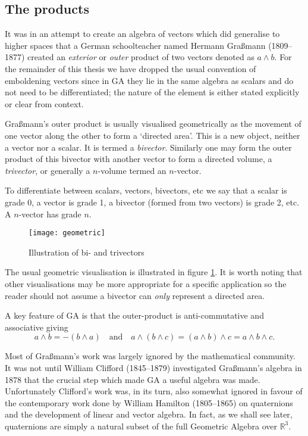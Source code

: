 \subsection{The products}

It was in an attempt\cite{GA:grassmann} to create an algebra of vectors which
did generalise to higher spaces that a German schoolteacher named Hermann
Gra{\ss}mann (1809--1877) created an \emph{exterior} or \emph{outer} product
of two vectors denoted as $a \wedge b$. For the remainder of this thesis we
have dropped the usual convention of emboldening vectors since in GA they lie
in the same algebra as scalars and do not need to be differentiated; the
nature of the element is either stated explicitly or clear from context.

Gra{\ss}mann's outer product is usually visualised geometrically as the
movement of one vector along the other to form a `directed area'. This is a
new object, neither a vector nor a scalar. It is termed a \emph{bivector}.
Similarly one may form the outer product of this bivector with another vector
to form a directed volume, a \emph{trivector}, or generally a $n$-volume
termed an $n$-vector. 

To differentiate between scalars, vectors, bivectors, etc we say that a scalar
is grade 0, a vector is grade 1, a bivector (formed from two vectors) is grade
2, etc. A $n$-vector has grade $n$.

\begin{figure}
\centering
\texttt{[image: geometric]}
\caption{Illustration of bi- and trivectors\label{fig:geometric}}
\end{figure}

The usual geometric visualisation is illustrated in figure \ref{fig:geometric}.
It is worth noting that other visualisations may be more appropriate for a specific
application so the reader should not assume a bivector can \emph{only} represent a
directed area. 

A key feature of GA is that the outer-product is anti-commutative and
associative giving
\begin{displaymath}
a \wedge b = - ( b \wedge a)\quad\mbox{and}\quad
a \wedge (b \wedge c) = (a \wedge b) \wedge c = a \wedge b \wedge c.
\end{displaymath}

Most of Gra{\ss}mann's work was largely ignored by the mathematical community.
It was not until William Clifford (1845--1879) investigated Gra{\ss}mann's
algebra in 1878\cite{GA:clifford} that the crucial step which made GA a useful
algebra was made. Unfortunately Clifford's work was, in its turn, also
somewhat ignored in favour of the contemporary work done by William Hamilton (1805--1865) 
on quaternions and
the development of linear and vector algebra. In fact, as we shall see later,
quaternions are simply a natural subset of the full Geometric Algebra over 
$\mathbb{R}^3$.

